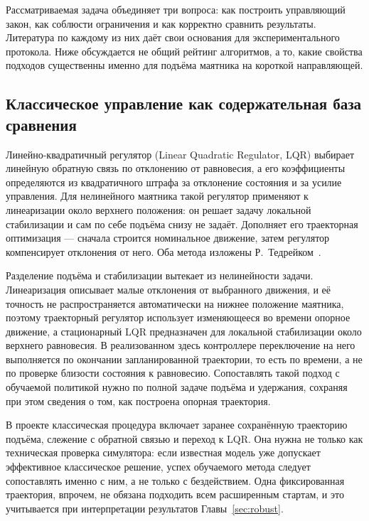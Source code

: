 \label{sec:review}
Рассматриваемая задача объединяет три вопроса: как построить управляющий закон, как соблюсти ограничения и как корректно сравнить результаты. Литература по каждому из них даёт свои основания для экспериментального протокола. Ниже обсуждается не общий рейтинг алгоритмов, а то, какие свойства подходов существенны именно для подъёма маятника на короткой направляющей.

\subsection{Классическое управление как содержательная база сравнения}
Линейно-квадратичный регулятор (Linear Quadratic Regulator, LQR) выбирает линейную обратную связь по отклонению от равновесия, а его коэффициенты определяются из квадратичного штрафа за отклонение состояния и за усилие управления. Для нелинейного маятника такой регулятор применяют к линеаризации около верхнего положения: он решает задачу локальной стабилизации и сам по себе подъёма снизу не задаёт. Дополняет его траекторная оптимизация — сначала строится номинальное движение, затем регулятор компенсирует отклонения от него. Оба метода изложены Р.~Тедрейком~\cite{tedrake_lqr,tedrake_traj}.

Разделение подъёма и стабилизации вытекает из нелинейности задачи. Линеаризация описывает малые отклонения от выбранного движения, и её точность не распространяется автоматически на нижнее положение маятника, поэтому траекторный регулятор использует изменяющееся во времени опорное движение, а стационарный LQR предназначен для локальной стабилизации около верхнего равновесия. В реализованном здесь контроллере переключение на него выполняется по окончании запланированной траектории, то есть по времени, а не по проверке близости состояния к равновесию. Сопоставлять такой подход с обучаемой политикой нужно по полной задаче подъёма и удержания, сохраняя при этом сведения о том, как построена опорная траектория.

В проекте классическая процедура включает заранее сохранённую траекторию подъёма, слежение с обратной связью и переход к LQR. Она нужна не только как техническая проверка симулятора: если известная модель уже допускает эффективное классическое решение, успех обучаемого метода следует сопоставлять именно с ним, а не только с бездействием. Одна фиксированная траектория, впрочем, не обязана подходить всем расширенным стартам, и это учитывается при интерпретации результатов Главы~\ref{sec:robust}.

